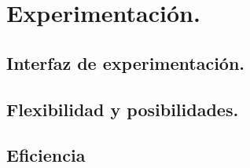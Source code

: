 \chapter{Experimentación.}\label{cap:capitulo6}


\section{Interfaz de experimentación.}


\section{Flexibilidad y posibilidades.}


\section{Eficiencia}



